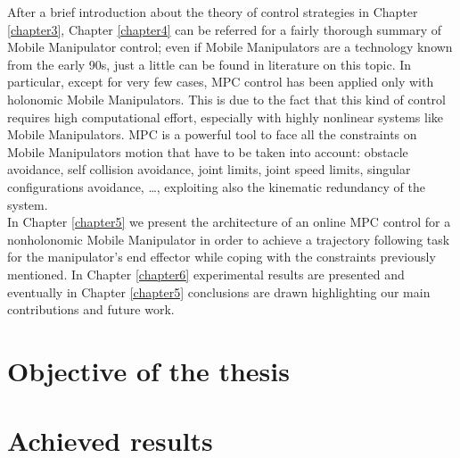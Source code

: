 After a brief introduction about the theory of control strategies in Chapter \ref{chapter3}, Chapter \ref{chapter4} can be referred for a fairly thorough summary of Mobile Manipulator control; even if Mobile Manipulators are a technology known from the early 90s, just a little can be found in literature on this topic. In particular, except for very few cases, MPC control has been applied only with holonomic Mobile Manipulators. This is due to the fact that this kind of control requires high computational effort, especially with highly nonlinear systems like Mobile Manipulators. MPC is a powerful tool to face all the constraints on Mobile Manipulators motion that have to be taken into account: obstacle avoidance, self collision avoidance, joint limits, joint speed limits, singular configurations avoidance, \dots, exploiting also the kinematic redundancy of the system.\\
In Chapter \ref{chapter5} we present the architecture of an online MPC control for a nonholonomic Mobile Manipulator in order to achieve a trajectory following task for the manipulator's end effector while coping with the constraints previously mentioned. In Chapter \ref{chapter6} experimental results are presented and eventually in Chapter \ref{chapter5} conclusions are drawn highlighting our main contributions and future work.	

\section{Objective of the thesis}


\section{Achieved results}


